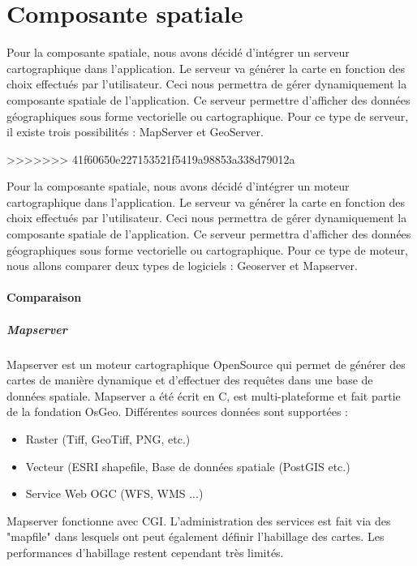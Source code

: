 \section{Composante spatiale}

Pour la composante spatiale, nous avons décidé d'intégrer un serveur cartographique dans l'application. Le serveur va générer la carte en fonction des choix effectués par l'utilisateur. Ceci nous permettra de gérer dynamiquement la composante spatiale de l'application. Ce serveur permettre d'afficher des données géographiques sous forme vectorielle ou cartographique. Pour ce type de serveur, il existe trois possibilités : MapServer et GeoServer.

>>>>>>> 41f60650e227153521f5419a98853a338d79012a

Pour la composante spatiale, nous avons décidé d'intégrer un moteur cartographique dans l'application. Le serveur va générer la carte en fonction des choix effectués par l'utilisateur. Ceci nous permettra de gérer dynamiquement la composante spatiale de l'application. Ce serveur permettra d'afficher des données géographiques sous forme vectorielle ou cartographique. Pour ce type de moteur, nous allons comparer deux types de logiciels : Geoserver et Mapserver. 

\paragraph{Comparaison}

\subparagraph{Mapserver}
Mapserver est un moteur cartographique OpenSource qui permet de générer des cartes de manière dynamique et d'effectuer des requêtes dans une base de données spatiale. Mapserver a été écrit en C, est multi-plateforme et fait partie de la fondation OsGeo. Différentes sources données sont supportées : \\

\begin{itemize}

\item Raster (Tiff, GeoTiff, PNG, etc.)
\item Vecteur (ESRI shapefile, Base de données spatiale (PostGIS etc.)
\item Service Web OGC (WFS, WMS ...)

\end{itemize}

Mapserver fonctionne avec CGI. L'administration des services est fait via des "mapfile" dans lesquels ont peut également définir l'habillage des cartes. Les performances d'habillage restent cependant très limités. \\


